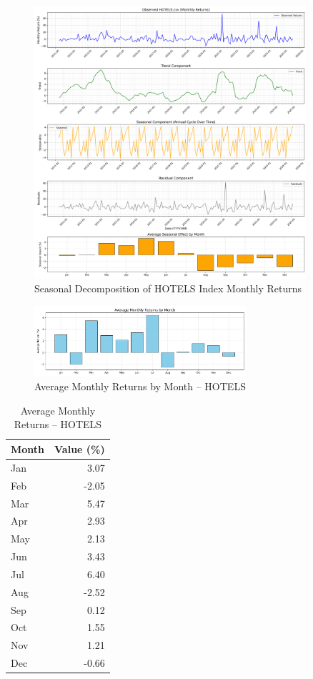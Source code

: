 \documentclass[12pt]{article}
\begin{document}
\begin{figure}[h!]
    \centering
    \includegraphics[width=0.9\textwidth]{decomposition_outputs/HOTELS_seasonal_decomposition.png}
    \caption{Seasonal Decomposition of HOTELS Index Monthly Returns}
\end{figure}

\begin{figure}[h!]
    \centering
    \includegraphics[width=0.7\textwidth]{decomposition_outputs/HOTELS_avg_monthly_returns.png}
    \caption{Average Monthly Returns by Month -- HOTELS}
\end{figure}

\begin{table}[h!]
\centering
\caption{Average Monthly Returns -- HOTELS}
\begin{tabular}{l r}
\toprule
Month & Value (\%) \\
\midrule
Jan & 3.07 \\
Feb & -2.05 \\
Mar & 5.47 \\
Apr & 2.93 \\
May & 2.13 \\
Jun & 3.43 \\
Jul & 6.40 \\
Aug & -2.52 \\
Sep & 0.12 \\
Oct & 1.55 \\
Nov & 1.21 \\
Dec & -0.66 \\
\bottomrule
\end{tabular}
\end{table}
\end{document}
